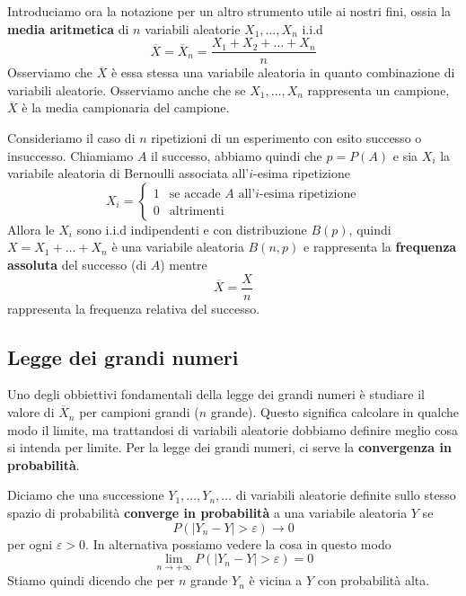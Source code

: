 Introduciamo ora la notazione per un altro strumento utile ai nostri fini, ossia la
\textbf{media aritmetica} di $n$ variabili aleatorie $X_1, \dots, X_n$ i.i.d
\[ \overline{X} = \overline{X}_n = \frac{X_1 + X_2 + \dots + X_n}{n} \]
Osserviamo che $\overline{X}$ è essa stessa una variabile aleatoria in quanto combinazione di
variabili aleatorie. Osserviamo anche che se $X_1, \dots, X_n$ rappresenta un campione,
$\overline{X}$ è la media campionaria del campione.

\begin{example}
	Consideriamo il caso di $n$ ripetizioni di un esperimento con esito successo o insuccesso.
	Chiamiamo $A$ il successo, abbiamo quindi che $p = P(A)$ e sia $X_i$ la variabile aleatoria di
	Bernoulli associata all'$i$-esima ripetizione
	\[
		X_i = \begin{cases}
			1 & \text{se accade $A$ all'$i$-esima ripetizione} \\
			0 & \text{altrimenti}
		\end{cases}
	\]
	Allora le $X_i$ sono i.i.d indipendenti e con distribuzione $B(p)$, quindi $X=X_1+\dots+X_n$ è
	una variabile aleatoria $B(n,p)$ e rappresenta la \textbf{frequenza assoluta} del successo
	(di $A$) mentre
	\[ \overline{X} = \frac{X}{n} \]
	rappresenta la frequenza relativa del successo.
\end{example}

\subsection{Legge dei grandi numeri}
Uno degli obbiettivi fondamentali della legge dei grandi numeri è studiare il valore di
$\overline{X}_n$ per campioni grandi ($n$ grande). Questo significa calcolare in qualche modo il
limite, ma trattandosi di variabili aleatorie dobbiamo definire meglio cosa si intenda per limite.
Per la legge dei grandi numeri, ci serve la \textbf{convergenza in probabilità}.

\begin{definition}
	Diciamo che una successione $Y_1, \dots, Y_n, \dots$ di variabili aleatorie definite sullo
	stesso spazio di probabilità \textbf{converge in probabilità} a una variabile aleatoria $Y$ se
	\[ P(|Y_n - Y| > \varepsilon) \to 0 \]
	per ogni $\varepsilon > 0$. In alternativa possiamo vedere la cosa in questo modo
	\[ \lim_{n \to +\infty} P(|Y_n - Y| > \varepsilon) = 0 \]
	Stiamo quindi dicendo che per $n$ grande $Y_n$ è vicina a $Y$ con probabilità alta.
\end{definition}

